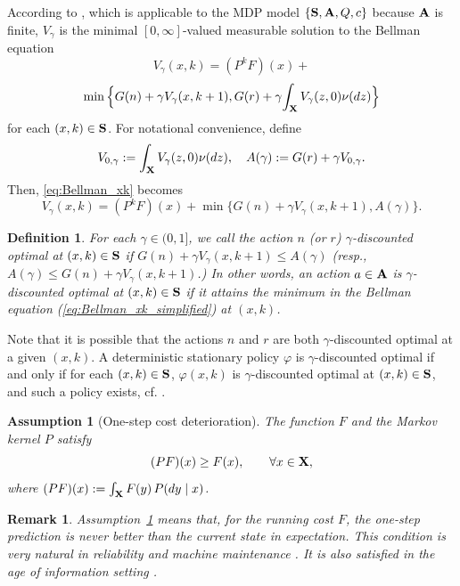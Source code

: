 \documentclass[letterpaper,10pt,conference]{ieeeconf}  %
\newtheorem{assumption}{Assumption}
\newtheorem{remark}{Remark}
\newtheorem{definition}{Definition}
\begin{document}
{According to \cite[Theorem 3.1]{FeinbergORL:2021}, which is applicable to the MDP model $\{{\bf S},{\bf A},Q,c\}$ because ${\bf A}$ is finite,} $V_\gamma$ is the minimal $[0,\infty]$-valued measurable solution to the Bellman equation
\begin{equation}
\label{eq:Bellman_xk}
{V_\gamma}(x,k) = (P^kF)(x) +
\end{equation}
\[
\min\Big\{G(n) + \gamma {V_\gamma}(x,k+1), G(r) + \gamma {\int_{{\bf X}}V_\gamma(z,0)\nu(dz)} \Big\}
\]
{for each $(x,k)\in {\bf S}$}.
For notational convenience, define
\begin{equation}
\label{eq:A_def}
{V_{0,\gamma}} := {\int_{{\bf X}}V_\gamma(z,0)\nu(dz)},
\quad
{A(\gamma)}:= G(r)+\gamma V_{0,\gamma}.
\end{equation}
Then, \eqref{eq:Bellman_xk} becomes
\begin{equation}
\label{eq:Bellman_xk_simplified}
V_\gamma(x,k) = (P^kF)(x) + \min\{ G(n)+\gamma V_\gamma(x,k+1), {A(\gamma)} \}.
\end{equation}

\begin{definition}
{For each $\gamma\in(0,1]$, we call the action $n$ (or $r$) $\gamma$-discounted optimal at $(x,k)\in {\bf S}$ if $G(n)+\gamma V_\gamma(x,k+1)\le {A(\gamma)}$ (resp.,  ${A(\gamma)} \le G(n)+\gamma V_\gamma(x,k+1)$.) In other words, an action $a\in {\bf A}$ is $\gamma$-discounted optimal at $(x,k)\in {\bf S}$ if it attains the minimum in the Bellman equation (\ref{eq:Bellman_xk_simplified}) at $(x,k)$.}
\end{definition} 
{
Note that it is possible that the actions $n$ and $r$ are both $\gamma$-discounted optimal at a given $(x,k)$. A deterministic stationary policy $\varphi$ is $\gamma$-discounted optimal if and only if for each $(x,k)\in {\bf S}$, $\varphi(x,k)$ is $\gamma$-discounted optimal at $(x,k)\in {\bf S}$, and such a policy exists, cf. \cite[Theorem 3.1]{FeinbergORL:2021}. }

\smallskip
\begin{assumption}[One-step cost deterioration]
\label{ass:PFgeF}
The function $F$ and the Markov kernel $P$ satisfy
\begin{equation}
\label{eq:PFgeF}
(PF)(x) \ge F(x), \qquad \forall x\in {\bf X},
\end{equation}
where $(PF)(x):=\int_{\bf X} F(y)\,P(dy \mid x)$.
\end{assumption}
\smallskip

\begin{remark}
Assumption~\ref{ass:PFgeF} means that, for the running cost $F$, the one-step prediction is never better than the
current state in expectation.
This condition is very natural in reliability and machine maintenance \cite{BP96}. It is also satisfied in the age of information setting \cite{TM24}.
\end{remark}
\end{document}
